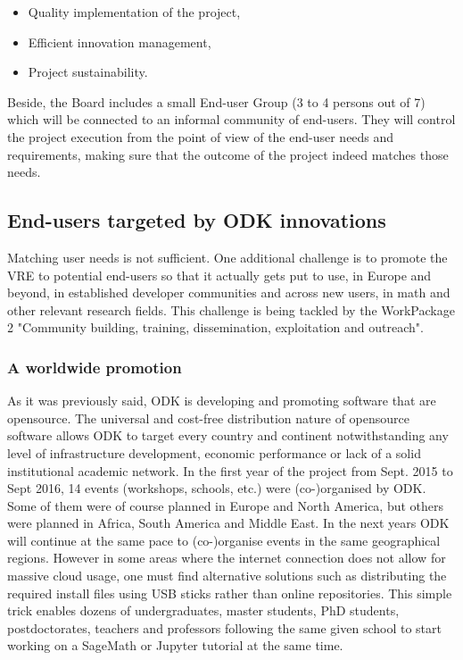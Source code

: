 \documentclass{deliverablereport}
\begin{document}
\begin{itemize}
\item Quality implementation of the project,
\item Efficient innovation management,
\item Project sustainability.
\end{itemize}

Beside, the Board includes a small End-user Group (3 to 4 persons out
of 7) which will be connected to an informal community of
end-users. They will control the project execution from the point of
view of the end-user needs and requirements, making sure that the
outcome of the project indeed matches those needs.

\subsection{End-users targeted by ODK innovations}

Matching user needs is not sufficient. One additional challenge is to
promote the VRE to potential end-users so that it actually gets put to
use, in Europe and beyond, in established developer communities and
across new users, in math and other relevant research fields. This
challenge is being tackled by the WorkPackage 2 "Community building,
training, dissemination, exploitation and outreach".


\subsubsection{A worldwide promotion}

As it was previously said, ODK is developing and promoting software that are opensource. The universal and cost-free distribution nature of opensource software allows ODK to target every country and continent notwithstanding any level of infrastructure development, economic performance or lack of a solid institutional academic network.
In the first year of the project from Sept. 2015 to Sept 2016, 14 events (workshops, schools, etc.) were (co-)organised by ODK. Some of them were of course planned in Europe and North America, but others were planned in Africa, South America and Middle East. In the next years ODK will continue at the same pace to (co-)organise events in the same geographical regions.
However in some areas where the internet connection does not allow for massive cloud usage, one must find alternative solutions such as distributing the required install files using USB sticks  rather than online repositories. This simple trick enables dozens of undergraduates, master students, PhD students, postdoctorates, teachers and professors following the same given school to start working on a SageMath or Jupyter tutorial at the same time.
\end{document}
